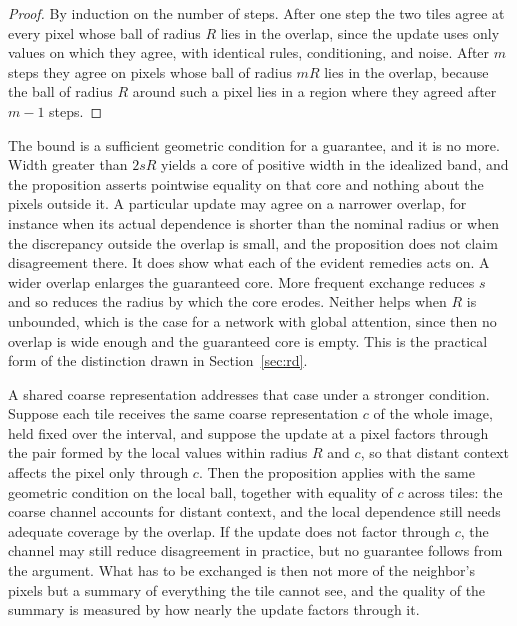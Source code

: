 \documentclass[11pt]{article}
\theoremstyle{definition}
\theoremstyle{plain}
\theoremstyle{remark}
\begin{document}
\begin{proof}
By induction on the number of steps. After one step the two tiles agree at every pixel whose ball of radius $R$ lies in the overlap, since the update uses only values on which they agree, with identical rules, conditioning, and noise. After $m$ steps they agree on pixels whose ball of radius $mR$ lies in the overlap, because the ball of radius $R$ around such a pixel lies in a region where they agreed after $m-1$ steps.
\end{proof}

The bound is a sufficient geometric condition for a guarantee, and it is no more. Width greater than $2sR$ yields a core of positive width in the idealized band, and the proposition asserts pointwise equality on that core and nothing about the pixels outside it. A particular update may agree on a narrower overlap, for instance when its actual dependence is shorter than the nominal radius or when the discrepancy outside the overlap is small, and the proposition does not claim disagreement there. It does show what each of the evident remedies acts on. A wider overlap enlarges the guaranteed core. More frequent exchange reduces $s$ and so reduces the radius by which the core erodes. Neither helps when $R$ is unbounded, which is the case for a network with global attention, since then no overlap is wide enough and the guaranteed core is empty. This is the practical form of the distinction drawn in Section~\ref{sec:rd}.

A shared coarse representation addresses that case under a stronger condition. Suppose each tile receives the same coarse representation $c$ of the whole image, held fixed over the interval, and suppose the update at a pixel factors through the pair formed by the local values within radius $R$ and $c$, so that distant context affects the pixel only through $c$. Then the proposition applies with the same geometric condition on the local ball, together with equality of $c$ across tiles: the coarse channel accounts for distant context, and the local dependence still needs adequate coverage by the overlap. If the update does not factor through $c$, the channel may still reduce disagreement in practice, but no guarantee follows from the argument. What has to be exchanged is then not more of the neighbor's pixels but a summary of everything the tile cannot see, and the quality of the summary is measured by how nearly the update factors through it.
\end{document}
